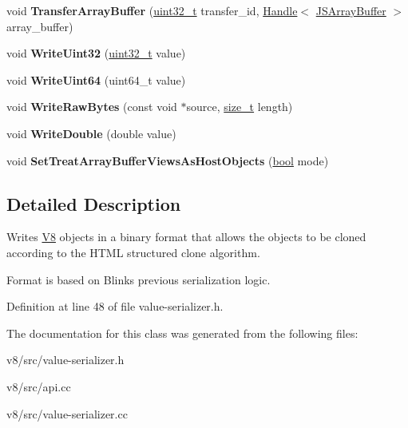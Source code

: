\begin{DoxyCompactItemize}
\item 
\mbox{\label{classv8_1_1internal_1_1ValueSerializer_add63ce48819f2e9d0534c506898b9056}} 
void {\bfseries Transfer\+Array\+Buffer} (\mbox{\hyperlink{classuint32__t}{uint32\+\_\+t}} transfer\+\_\+id, \mbox{\hyperlink{classv8_1_1internal_1_1Handle}{Handle}}$<$ \mbox{\hyperlink{classv8_1_1internal_1_1JSArrayBuffer}{J\+S\+Array\+Buffer}} $>$ array\+\_\+buffer)
\item 
\mbox{\label{classv8_1_1internal_1_1ValueSerializer_a30fc89c57f595c052331c6ae78301324}} 
void {\bfseries Write\+Uint32} (\mbox{\hyperlink{classuint32__t}{uint32\+\_\+t}} value)
\item 
\mbox{\label{classv8_1_1internal_1_1ValueSerializer_aff79763f2569a7f0fc0c052b49fc17f1}} 
void {\bfseries Write\+Uint64} (uint64\+\_\+t value)
\item 
\mbox{\label{classv8_1_1internal_1_1ValueSerializer_ab2e18bdd72a02ec08b6fd38ce0716c9f}} 
void {\bfseries Write\+Raw\+Bytes} (const void $\ast$source, \mbox{\hyperlink{classsize__t}{size\+\_\+t}} length)
\item 
\mbox{\label{classv8_1_1internal_1_1ValueSerializer_af5e65a1e3a889104f7e492c1f560eaf1}} 
void {\bfseries Write\+Double} (double value)
\item 
\mbox{\label{classv8_1_1internal_1_1ValueSerializer_a5edae6ad7855c7372ba39d70f703aba5}} 
void {\bfseries Set\+Treat\+Array\+Buffer\+Views\+As\+Host\+Objects} (\mbox{\hyperlink{classbool}{bool}} mode)
\end{DoxyCompactItemize}


\subsection{Detailed Description}
Writes \mbox{\hyperlink{classv8_1_1internal_1_1V8}{V8}} objects in a binary format that allows the objects to be cloned according to the H\+T\+ML structured clone algorithm.

Format is based on Blink\textquotesingle{}s previous serialization logic. 

Definition at line 48 of file value-\/serializer.\+h.



The documentation for this class was generated from the following files\+:\begin{DoxyCompactItemize}
\item 
v8/src/value-\/serializer.\+h\item 
v8/src/api.\+cc\item 
v8/src/value-\/serializer.\+cc\end{DoxyCompactItemize}
